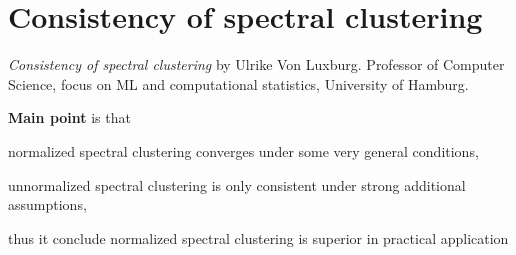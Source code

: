 \section{Consistency of spectral clustering}
\label{ch:ulrike2008}

\textit{Consistency of spectral clustering} by Ulrike Von Luxburg. Professor of Computer Science, focus on ML and computational statistics, University of Hamburg.
\newline

\textbf{Main point} is that \begin{inparaenum}
\item normalized spectral clustering converges under some very general conditions, 
\item unnormalized spectral clustering is only consistent under strong additional assumptions, 
\item thus it conclude normalized spectral clustering is superior in practical application
\end{inparaenum}
